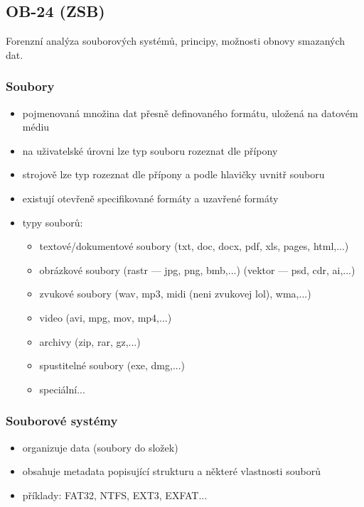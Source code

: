 \subsection{OB-24 (ZSB)}
Forenzní analýza souborových systémů, principy, možnosti obnovy smazaných dat.

\subsubsection*{Soubory}
\begin{itemize}
	\item pojmenovaná množina dat přesně definovaného formátu, uložená na datovém médiu
	\item na uživatelské úrovni lze typ souboru rozeznat dle přípony
	\item strojově lze typ rozeznat dle přípony a podle hlavičky uvnitř souboru
	\item existují otevřeně specifikované formáty a uzavřené formáty
	\item typy souborů:
	\begin{itemize}
		\item textové/dokumentové soubory (txt, doc, docx, pdf, xls, pages, html,...)
		\item obrázkové soubory (rastr --- jpg, png, bmb,...) (vektor --- psd, cdr, ai,...)
		\item zvukové soubory (wav, mp3, midi (neni zvukovej lol), wma,...)
		\item video (avi, mpg, mov, mp4,...)
		\item archivy (zip, rar, gz,...)
		\item spustitelné soubory (exe, dmg,...)
		\item speciální...
	\end{itemize}
\end{itemize}

\subsubsection*{Souborové systémy}
\begin{itemize}
	\item organizuje data (soubory do složek)
	\item obsahuje metadata popisující strukturu a některé vlastnosti souborů
	\item příklady: FAT32, NTFS, EXT3, EXFAT...
\end{itemize}

